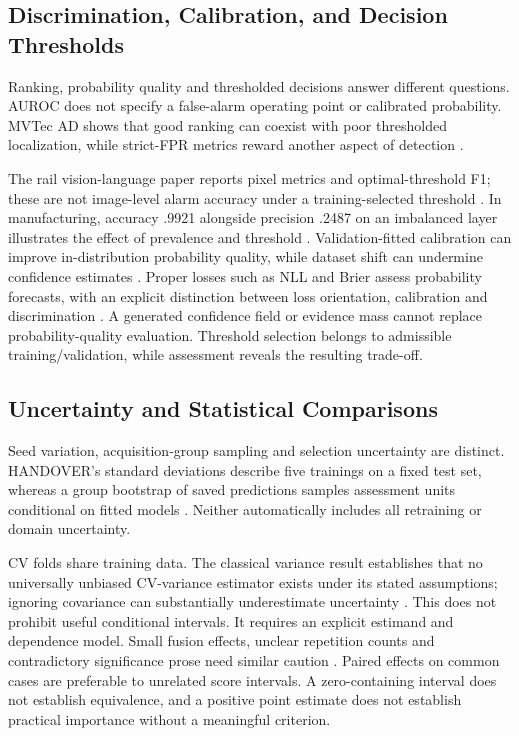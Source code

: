 \subsection{Discrimination, Calibration, and Decision Thresholds}
Ranking, probability quality and thresholded decisions answer different questions. AUROC does not specify a false-alarm operating point or calibrated probability. MVTec AD shows that good ranking can coexist with poor thresholded localization, while strict-FPR metrics reward another aspect of detection \citep{Bergmann2019MVTec,Costanzino2024Multimodal,Cheng2025Multimodal}.

The rail vision-language paper reports pixel metrics and optimal-threshold F1; these are not image-level alarm accuracy under a training-selected threshold \citep[PDF p.~7]{P031}. In manufacturing, accuracy .9921 alongside precision .2487 on an imbalanced layer illustrates the effect of prevalence and threshold \citep{Petrich2021Multimodal}. Validation-fitted calibration can improve in-distribution probability quality, while dataset shift can undermine confidence estimates \citep{Guo2017Calibration,P008}. Proper losses such as NLL and Brier assess probability forecasts, with an explicit distinction between loss orientation, calibration and discrimination \citep{P055}. A generated confidence field or evidence mass cannot replace probability-quality evaluation. Threshold selection belongs to admissible training/validation, while assessment reveals the resulting trade-off.

\subsection{Uncertainty and Statistical Comparisons}
Seed variation, acquisition-group sampling and selection uncertainty are distinct. HANDOVER's standard deviations describe five trainings on a fixed test set, whereas a group bootstrap of saved predictions samples assessment units conditional on fitted models \citep{Thoduka2024Handover}. Neither automatically includes all retraining or domain uncertainty.

CV folds share training data. The classical variance result establishes that no universally unbiased CV-variance estimator exists under its stated assumptions; ignoring covariance can substantially underestimate uncertainty \citep[PDF pp.~8--10]{Bengio2004CVVariance}. This does not prohibit useful conditional intervals. It requires an explicit estimand and dependence model. Small fusion effects, unclear repetition counts and contradictory significance prose need similar caution \citep{Gu2024Improved,Xu2025ModalityResilient}. Paired effects on common cases are preferable to unrelated score intervals. A zero-containing interval does not establish equivalence, and a positive point estimate does not establish practical importance without a meaningful criterion.

